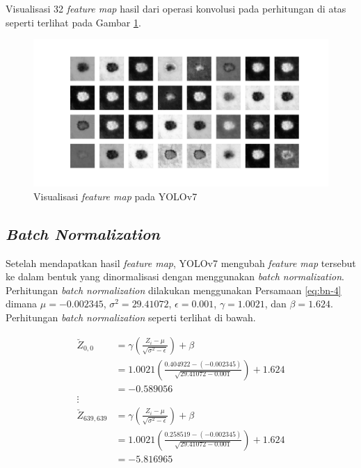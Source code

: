     Visualisasi 32 \textit{feature map} hasil dari operasi konvolusi pada perhitungan di atas seperti terlihat pada Gambar \ref{fig:d-feamap}.

    \begin{figure}[H]
        \begin{center}
            \includegraphics[width=12cm]{img/bab4/conv-layer.png}
            \caption{Visualisasi \textit{feature map} pada YOLOv7}
            \label{fig:d-feamap}
        \end{center}
    \end{figure}
    
    \subsection{\textit{Batch Normalization}}

    Setelah mendapatkan hasil \textit{feature map}, YOLOv7 mengubah \textit{feature map} tersebut ke dalam bentuk yang dinormalisasi dengan menggunakan \textit{batch normalization}. Perhitungan \textit{batch normalization} dilakukan menggunakan Persamaan \ref{eq:bn-4} dimana $\mu = -0.002345$, $\sigma^2 = 29.41072$, $\epsilon = 0.001$, $\gamma = 1.0021$, dan $\beta = 1.624$. Perhitungan \textit{batch normalization} seperti terlihat di bawah.

    \begin{align*}
        \breve{Z}_{0, 0}     &= \gamma \left( \frac{Z_{i} - \mu}{\sqrt{\sigma^2 - \epsilon}} \right) + \beta \\
                             &= 1.0021 \left( \frac{0.404922 - (-0.002345)}{\sqrt{29.41072 - 0.001}} \right) + 1.624\\
                             &= -0.589056\\
        \vdots\\
        \breve{Z}_{639, 639} &= \gamma \left( \frac{Z_{i} - \mu}{\sqrt{\sigma^2 - \epsilon}} \right) + \beta \\
                             &= 1.0021 \left( \frac{0.258519 - (-0.002345)}{\sqrt{29.41072 - 0.001}} \right) + 1.624\\
                             &= -5.816965\\
    \end{align*}

